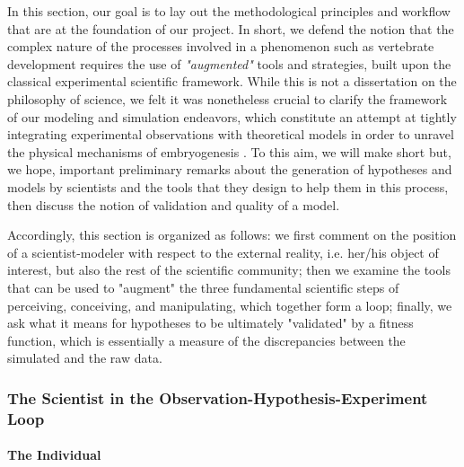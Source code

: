 In this section, our goal is to lay out the methodological principles and workflow that are at the foundation of our project. In short, we defend the notion that the complex nature of the processes involved in a phenomenon such as vertebrate development requires the use of \textit{"augmented"} tools and strategies, built upon the classical experimental scientific framework. While this is not a dissertation on the philosophy of science, we felt it was nonetheless crucial to clarify the framework of our modeling and simulation endeavors, which constitute an attempt at tightly integrating experimental observations with theoretical models in order to unravel the physical mechanisms of embryogenesis \cite{Varner:2012in}. To this aim, we will make short but, we hope, important preliminary remarks about the generation of hypotheses and models by scientists and the tools that they design to help them in this process, then discuss the notion of validation and quality of a model.

Accordingly, this section is organized as follows: we first comment on the position of a scientist-modeler with respect to the external reality, i.e. her/his object of interest, but also the rest of the scientific community; then we examine the tools that can be used to "augment" the three fundamental scientific steps of perceiving, conceiving, and manipulating, which together form a loop; finally, we ask what it means for hypotheses to be ultimately "validated" by a fitness function, which is essentially a measure of the discrepancies between the simulated and the raw data.


\subsubsection{The Scientist in the Observation-Hypothesis-Experiment Loop }



\paragraph{The Individual}


